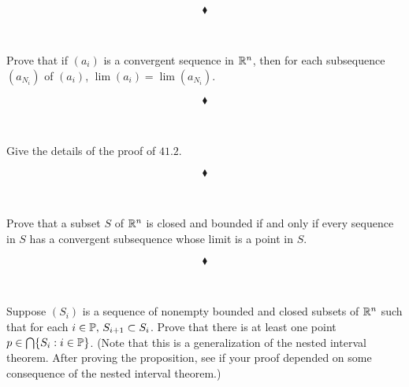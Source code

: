 $$\blacklozenge$$\\


\subsection{}
\begin{tcolorbox}
Prove that if $(a_i)$ is a convergent sequence in $\mathbb{R}^n$, then for each
subsequence $(a_{N_i})$ of $(a_i)$, $\lim (a_i) = \lim (a_{N_i})$.
\end{tcolorbox}

$$\blacklozenge$$\\

\newpage


\subsection{}
\begin{tcolorbox}
Give the details of the proof of $\mathbf{41.2}$.
\end{tcolorbox}

$$\blacklozenge$$\\


\subsection{}
\begin{tcolorbox}
Prove that a subset $S$ of $\mathbb{R}^n$ is closed and bounded if and only if
every sequence in $S$ has a convergent subsequence whose limit
is a point in $S$.
\end{tcolorbox}

$$\blacklozenge$$\\


\subsection{}
\begin{tcolorbox}
Suppose $(S_i)$ is a sequence of nonempty bounded and closed
subsets of $\mathbb{R}^n$ such that for each $i\in \mathbb{P},\, S_{i+1}\subset S_i$. Prove that there
is at least one point $p\in\bigcap\{S_i:i\in \mathbb{P}\}$. (Note that this is a generalization of the nested interval theorem. After proving the proposition, see if your proof depended on some consequence of the nested interval theorem.)
\end{tcolorbox}

